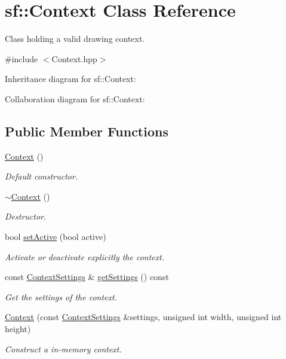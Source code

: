 \hypertarget{classsf_1_1_context}{}\section{sf\+:\+:Context Class Reference}
\label{classsf_1_1_context}


Class holding a valid drawing context.  




{\ttfamily \#include $<$Context.\+hpp$>$}



Inheritance diagram for sf\+:\+:Context\+:


Collaboration diagram for sf\+:\+:Context\+:
\subsection*{Public Member Functions}
\begin{DoxyCompactItemize}
\item 
\hyperlink{classsf_1_1_context_aba22797a790706ca2c5c04ee39f2b555}{Context} ()
\begin{DoxyCompactList}\small\item\em Default constructor. \end{DoxyCompactList}\item 
\hyperlink{classsf_1_1_context_a805b1bbdb3e52b1fda7c9bf2cd6ca86b}{$\sim$\+Context} ()
\begin{DoxyCompactList}\small\item\em Destructor. \end{DoxyCompactList}\item 
bool \hyperlink{classsf_1_1_context_a0806f915ea81ae1f4e8135a7a3696562}{set\+Active} (bool active)
\begin{DoxyCompactList}\small\item\em Activate or deactivate explicitly the context. \end{DoxyCompactList}\item 
const \hyperlink{structsf_1_1_context_settings}{Context\+Settings} \& \hyperlink{classsf_1_1_context_a2cc81c5466553d1901f660d866b4b48b}{get\+Settings} () const
\begin{DoxyCompactList}\small\item\em Get the settings of the context. \end{DoxyCompactList}\item 
\hyperlink{classsf_1_1_context_a2a9e3529e48919120e6b6fc10bad296c}{Context} (const \hyperlink{structsf_1_1_context_settings}{Context\+Settings} \&settings, unsigned int width, unsigned int height)
\begin{DoxyCompactList}\small\item\em Construct a in-\/memory context. \end{DoxyCompactList}\end{DoxyCompactItemize}

